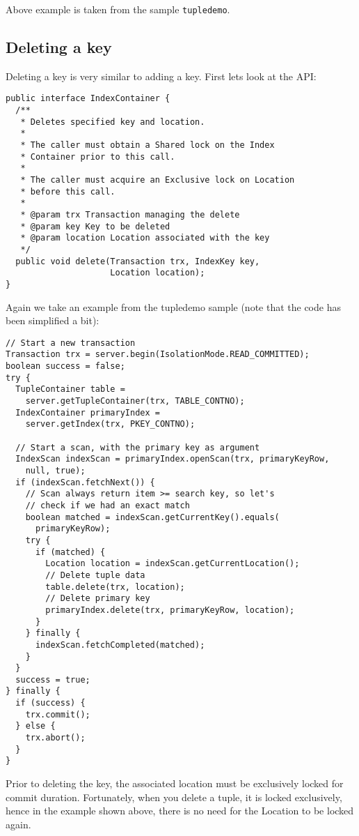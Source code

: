 \documentclass[a4paper,draft,oneside]{book}
\begin{document}
Above example is taken from the sample \verb|tupledemo|. 

\subsection{Deleting a key}
\label{sec:delkey}

Deleting a key is very similar to adding a key. First lets look
at the API:

\begin{verbatim}
public interface IndexContainer {
  /**
   * Deletes specified key and location. 
   * 
   * The caller must obtain a Shared lock on the Index 
   * Container prior to this call.
   *
   * The caller must acquire an Exclusive lock on Location 
   * before this call.
   * 
   * @param trx Transaction managing the delete
   * @param key Key to be deleted
   * @param location Location associated with the key
   */
  public void delete(Transaction trx, IndexKey key, 
                     Location location);
}
\end{verbatim}

Again we take an example from the tupledemo sample (note that
the code has been simplified a bit):

\begin{verbatim}
// Start a new transaction
Transaction trx = server.begin(IsolationMode.READ_COMMITTED);
boolean success = false;
try {
  TupleContainer table = 
    server.getTupleContainer(trx, TABLE_CONTNO);
  IndexContainer primaryIndex = 
    server.getIndex(trx, PKEY_CONTNO);

  // Start a scan, with the primary key as argument
  IndexScan indexScan = primaryIndex.openScan(trx, primaryKeyRow,
    null, true);
  if (indexScan.fetchNext()) {
    // Scan always return item >= search key, so let's
    // check if we had an exact match
    boolean matched = indexScan.getCurrentKey().equals(
      primaryKeyRow);
    try {
      if (matched) {
        Location location = indexScan.getCurrentLocation();
        // Delete tuple data
        table.delete(trx, location);
        // Delete primary key
        primaryIndex.delete(trx, primaryKeyRow, location);
      }
    } finally {
      indexScan.fetchCompleted(matched);
    }
  }
  success = true;
} finally {
  if (success) {
    trx.commit();
  } else {
    trx.abort();
  }
}
\end{verbatim}

Prior to deleting the key, the associated location must be
exclusively locked for commit duration. Fortunately, when you delete
a tuple, it is locked exclusively, hence in the example shown above,
there is no need for the Location to be locked again.
\end{document}
